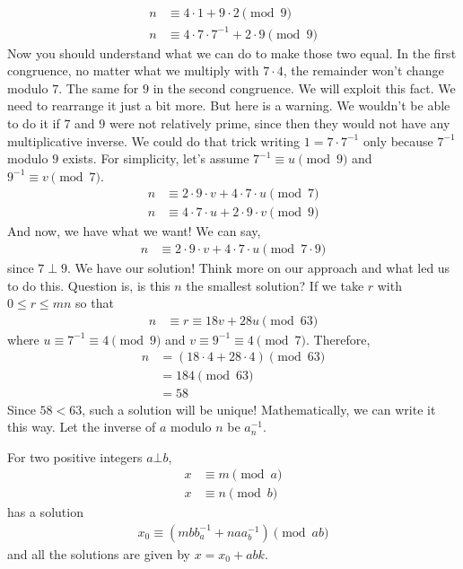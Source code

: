\documentclass{subfile}
\begin{document}
		\begin{align*}
			n & \equiv4\cdot1+9\cdot2\pmod{9}\\
			n & \equiv4\cdot7\cdot7^{-1}+2\cdot9\pmod{9}
		\end{align*}
	Now you should understand what we can do to make those two equal. In the first congruence, no matter what we multiply with $7\cdot4$, the remainder won't change modulo $7$. The same for $9$ in the second congruence. We will exploit this fact. We need to rearrange it just a bit more. But here is a warning. We wouldn't be able to do it if $7$ and $9$ were not relatively prime, since then they would not have any multiplicative inverse. We could do that trick writing $1=7\cdot7^{-1}$ only because $7^{-1}$ modulo $9$ exists. For simplicity, let's assume $7^{-1}\equiv u\pmod{9}$ and $9^{-1}\equiv v\pmod{7}$.
		\begin{align*}
			n & \equiv2\cdot9\cdot v+4\cdot7\cdot u\pmod{7}\\
			n & \equiv4\cdot7\cdot u+2\cdot9\cdot v\pmod{9}
		\end{align*}
	And now, we have what we want! We can say,
		\begin{align*}
			n & \equiv2\cdot9\cdot v+4\cdot7\cdot u\pmod{7\cdot9}
		\end{align*}
	since $7 \perp 9$. We have our solution! Think more on our approach and what led us to do this. Question is, is this $n$ the smallest solution? If we take $r$ with $0\leq r\leq mn$ so that
		\begin{align*}
			n & \equiv r\equiv18v+28u\pmod{63}
		\end{align*}
	where $u\equiv7^{-1}\equiv4\pmod9$ and $v\equiv9^{-1}\equiv4\pmod 7$. Therefore,
		\begin{align*}
			n
				& = (18\cdot4+28\cdot4)\pmod{63}\\
				& =184\pmod{63}\\
				& =58
		\end{align*}
	Since $58<63$, such a solution will be unique! Mathematically, we can write it this way. Let the inverse of $a$ modulo $n$ be $a^{-1}_n$.
		\begin{theorem}
			For two positive integers $a\bot b$,
				\begin{align*}
					x & \equiv m\pmod a\\
					x & \equiv n\pmod b
				\end{align*}
			has a solution
				\begin{align*}
					x_0 \equiv (mbb^{-1}_a+naa^{-1}_b)\pmod{ab}
				\end{align*}
			and all the solutions are given by $x=x_0+abk$.
		\end{theorem}
\end{document}
